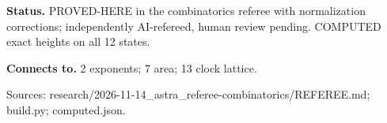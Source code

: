 \documentclass[10pt,a4paper]{amsart}
\begin{document}
\textbf{Status.} PROVED-HERE in the combinatorics referee with normalization corrections; independently AI-refereed, human review pending. COMPUTED exact heights on all 12 states.

\textbf{Connects to.} 2 exponents; 7 area; 13 clock lattice.

{\footnotesize\raggedright Sources: research/\allowbreak{}2026-11-14\_astra\_referee-combinatorics/\allowbreak{}REFEREE.md;\allowbreak{} build.py;\allowbreak{} computed.json.\par}
\end{document}
